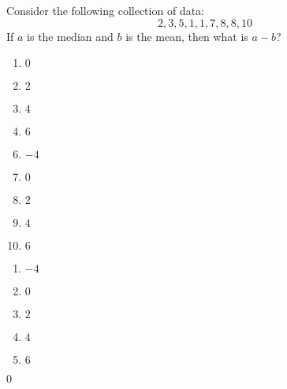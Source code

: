 



  Consider the following collection of data:
\[2,3,5,1,1,7,8,8,10\]
If $a$ is the median and $b$ is the mean, then what is $a-b$? 


\ifsat
	\begin{enumerate}[label=\Alph*)]
		\item  $0$ %
		\item  $2$  
		\item  $4$
		\item  $6$
	\end{enumerate}
\else
\fi

\ifacteven
	\begin{enumerate}[label=\textbf{\Alph*.},itemsep=\fill,align=left]
		\setcounter{enumii}{5}
		\item  $-4$ 
		\item  $0$ %
		\item  $2$  
		\addtocounter{enumii}{1}
		\item  $4$
		\item  $6$
	\end{enumerate}
\else
\fi

\ifactodd
	\begin{enumerate}[label=\textbf{\Alph*.},itemsep=\fill,align=left]
		\item  $-4$ 
		\item  $0$ %
		\item  $2$  
		\item  $4$
		\item  $6$
	\end{enumerate}
\else
\fi

\ifgridin
  $0$ %
		
\else
\fi


